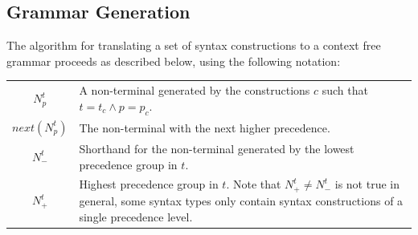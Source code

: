 \documentclass{kththesis}
\begin{document}
\subsection{Grammar Generation}

The algorithm for translating a set of syntax constructions to a context free grammar proceeds as described below, using the following notation:

\mathligsoff
{\tabulinesep=2mm
\begin{tabu}{c|p{10cm}}
$N^t_p$ & A non-terminal generated by the constructions $c$ such that $t = t_c \land p = p_c$. \\
$next(N^t_p)$ & The non-terminal with the next higher precedence. \\
$N^t_-$ & Shorthand for the non-terminal generated by the lowest precedence group in $t$. \\
$N^t_+$ & Highest precedence group in $t$. Note that $N^t_+ \neq N^t_-$ is not true in general, some syntax types only contain syntax constructions of a single precedence level. \\
\end{tabu}
}
\end{document}
